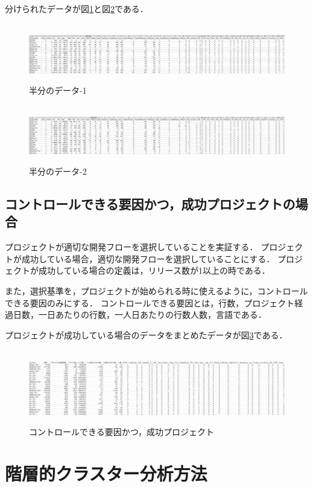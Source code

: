 分けられたデータが図\ref{tab:itiran-1}と図\ref{tab:itiran-2}である．
\begin{figure}[H]
\centering　
\includegraphics[width=13cm]{allData1.png}
\caption{半分のデータ-1}\label{tab:itiran-1}
\end{figure}
\begin{figure}[H]
\centering　
\includegraphics[width=13cm]{allData2.png}
\caption{半分のデータ-2}\label{tab:itiran-2}
\end{figure}


\subsection{コントロールできる要因かつ，成功プロジェクトの場合}

プロジェクトが適切な開発フローを選択していることを実証する．
プロジェクトが成功している場合，適切な開発フローを選択していることにする．
プロジェクトが成功している場合の定義は，リリース数が1以上の時である．

また，選択基準を，プロジェクトが始められる時に使えるように，コントロールできる要因のみにする．
コントロールできる要因とは，行数，プロジェクト経過日数，一日あたりの行数，一人日あたりの行数人数，言語である．

プロジェクトが成功している場合のデータをまとめたデータが図\ref{only}である．


\begin{figure}[H]
\centering　
\includegraphics[width=13cm]{onlyData.png}
\caption{コントロールできる要因かつ，成功プロジェクト}\label{only}
\end{figure}



\section{階層的クラスター分析方法}

